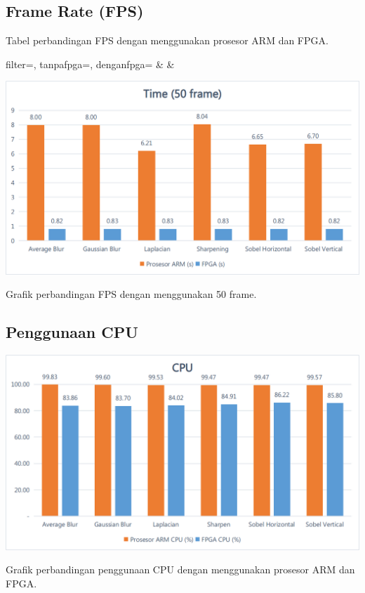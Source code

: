 \subsection{Frame Rate (FPS)}
\begin{atable}
    \caption{Tabel perbandingan FPS dengan menggunakan prosesor ARM dan FPGA.}
    \label{table:hasil-fps}
        {filter=\filter, tanpafpga=\tanpafpga, denganfpga=\denganfpga}
        {\filter & \tanpafpga & \denganfpga }
\end{atable}
\begin{afigure}
    \includegraphics[width=0.9\linewidth, center]{images/chart/chart-time50.png}
    \caption{Grafik perbandingan FPS dengan menggunakan 50 frame.}
    \label{fig:chart-fps50}
\end{afigure}

\subsection{Penggunaan CPU}
\blindtext
\begin{afigure}
    \includegraphics[width=0.9\linewidth, center]{images/chart/chart-cpu.png}
    \caption{Grafik perbandingan penggunaan CPU dengan menggunakan prosesor ARM dan FPGA.}
    \label{fig:chart-cpu}
\end{afigure}


